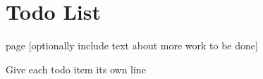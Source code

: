\chapter{Todo List}
\hypertarget{todo}{}\label{todo}

\begin{DoxyRefList}
\item[page \doxylink{index}{Astéroïdes Doc} ]\label{todo__todo000001}%
%
\mbox{[}optionally include text about more work to be done\mbox{]} 



Give each todo item its own line
\end{DoxyRefList}